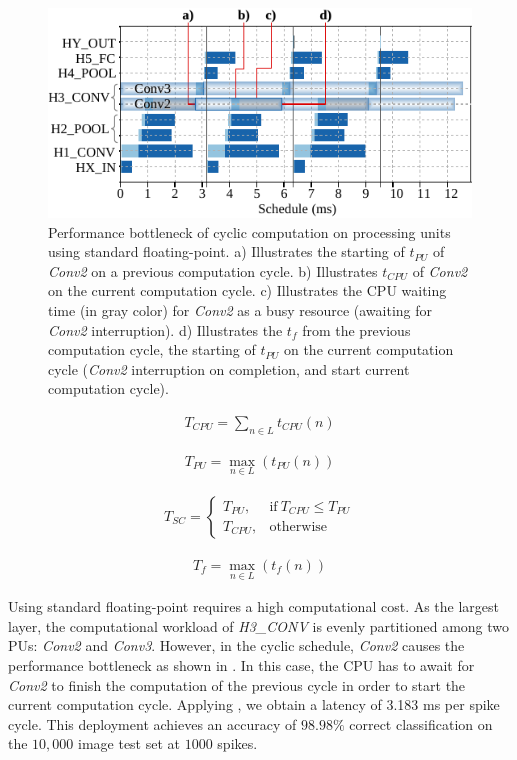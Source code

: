 \begin{figure}[h!]
	\centering
	\includegraphics[width=1\columnwidth]{../figures/latency_fp_cycle.pdf}
	\caption{Performance bottleneck of cyclic computation on processing units using standard floating-point. a) Illustrates the starting of $t_{PU}$ of \emph{Conv2} on a previous computation cycle. b) Illustrates $t_{CPU}$ of \emph{Conv2} on the current computation cycle. c) Illustrates the CPU waiting time (in gray color) for \emph{Conv2} as a busy resource (awaiting for \emph{Conv2} interruption). d) Illustrates the $t_{f}$ from the previous computation cycle, the starting of $t_{PU}$ on the current computation cycle (\emph{Conv2} interruption on completion, and start current computation cycle).}
	\label{fig:latency_pu_fp_cycle}
\end{figure}

\begin{eqnarray} \label{eq:time_cpu}
T_{CPU} = \sum_{n\in L} t_{CPU}(n)
\end{eqnarray}

\begin{eqnarray} \label{eq:time_pu}
T_{PU} = \max_{n\in L}(t_{PU}(n))
\end{eqnarray}

\begin{eqnarray} \label{eq:time_spike}
T_{SC} =
\begin{cases}
T_{PU}, & \text{if}\ T_{CPU}\le T_{PU} \\
T_{CPU}, & \text{otherwise}
\end{cases}
\end{eqnarray}

\begin{eqnarray} \label{eq:time_finish}
T_{f} = \max_{n\in L}(t_{f}(n))
\end{eqnarray}

Using standard floating-point requires a high computational cost. As the largest layer, the computational workload of \emph{H3\_CONV} is evenly partitioned among two PUs: \emph{Conv2} and \emph{Conv3}. However, in the cyclic schedule, \emph{Conv2} causes the performance bottleneck as shown in . In this case, the CPU has to await for \emph{Conv2} to finish the computation of the previous cycle in order to start the current computation cycle. Applying , we obtain a latency of 3.183 ms per spike cycle. This deployment achieves an accuracy of $98.98\%$ correct classification on the $10,000$ image test set at $1000$ spikes.

